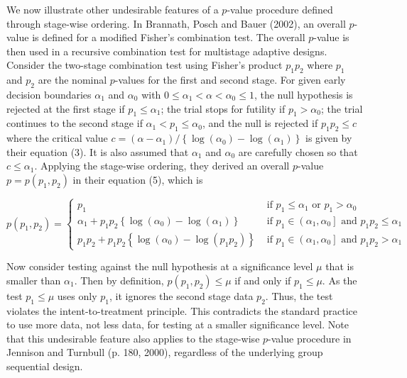 \documentclass[10pt]{article}
\begin{document}
We now illustrate other undesirable features of a $p$-value procedure defined through stage-wise ordering. In Brannath, Posch and Bauer (2002), an overall $p$-value is defined for a modified Fisher's combination test. The overall $p$-value is then used in a recursive combination test for multistage adaptive designs. Consider the two-stage combination test using Fisher's product $p_{1} p_{2}$ where $p_{1}$\\
and $p_{2}$ are the nominal $p$-values for the first and second stage. For given early decision boundaries $\alpha_{1}$ and $\alpha_{0}$ with $0 \leq \alpha_{1}<\alpha<\alpha_{0} \leq 1$, the null hypothesis is rejected at the first stage if $p_{1} \leq \alpha_{1}$; the trial stops for futility if $p_{1}>\alpha_{0}$; the trial continues to the second stage if $\alpha_{1}<p_{1} \leq \alpha_{0}$, and the null is rejected if $p_{1} p_{2} \leq c$ where the critical value $c=\left(\alpha-\alpha_{1}\right) /\left\{\log \left(\alpha_{0}\right)-\log \left(\alpha_{1}\right)\right\}$ is given by their equation (3). It is also assumed that $\alpha_{1}$ and $\alpha_{0}$ are carefully chosen so that $c \leq \alpha_{1}$. Applying the stage-wise ordering, they derived an overall $p$-value $p=p\left(p_{1}, p_{2}\right)$ in their equation (5), which is

$$
p\left(p_{1}, p_{2}\right)= \begin{cases}p_{1} & \text { if } p_{1} \leq \alpha_{1} \text { or } p_{1}>\alpha_{0} \\ \alpha_{1}+p_{1} p_{2}\left\{\log \left(\alpha_{0}\right)-\log \left(\alpha_{1}\right)\right\} & \text { if } p_{1} \in\left(\alpha_{1}, \alpha_{0}\right] \text { and } p_{1} p_{2} \leq \alpha_{1} \\ p_{1} p_{2}+p_{1} p_{2}\left\{\log \left(\alpha_{0}\right)-\log \left(p_{1} p_{2}\right)\right\} & \text { if } p_{1} \in\left(\alpha_{1}, \alpha_{0}\right] \text { and } p_{1} p_{2}>\alpha_{1}\end{cases}
$$

Now consider testing against the null hypothesis at a significance level $\mu$ that is smaller than $\alpha_{1}$. Then by definition, $p\left(p_{1}, p_{2}\right) \leq \mu$ if and only if $p_{1} \leq \mu$. As the test $p_{1} \leq \mu$ uses only $p_{1}$, it ignores the second stage data $p_{2}$. Thus, the test violates the intent-to-treatment principle. This contradicts the standard practice to use more data, not less data, for testing at a smaller significance level. Note that this undesirable feature also applies to the stage-wise $p$-value procedure in Jennison and Turnbull (p. 180, 2000), regardless of the underlying group sequential design.
\end{document}
